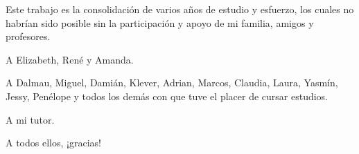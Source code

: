 \begin{acknowledgements}
Este trabajo es la consolidación de varios años de estudio y esfuerzo, los cuales no habrían sido
posible sin la participación y apoyo de mi familia, amigos y profesores.  

\bigskip

A Elizabeth, René y Amanda.

\bigskip

A Dalmau, Miguel, Damián, Klever, Adrian, Marcos, Claudia, Laura, Yasmín, Jessy, Penélope y todos 
los demás con que tuve el placer de cursar estudios.

\bigskip

A mi tutor.

\begin{flushright}
A todos ellos, ¡gracias!
\end{flushright}
\end{acknowledgements}